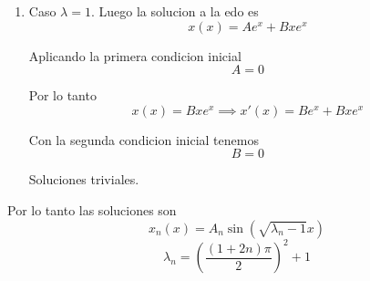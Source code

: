 \message{ !name(MAT024.tex)}\documentclass[../main.tex]{subfiles}
\begin{document}
\begin{solution}
\begin{enumerate}
      \item Caso $\lambda = 1$. Luego la solucion a la edo es
            \begin{equation*}
              x(x) = Ae^{x} + Bxe^{x}
            \end{equation*}

            Aplicando la primera condicion inicial
            \begin{equation*}
              A = 0
            \end{equation*}

            Por lo tanto
            \begin{equation*}
              x(x) = Bxe^{x} \implies x'(x) = Be^{x} + Bxe^{x}
            \end{equation*}

            Con la segunda condicion inicial tenemos
            \begin{equation*}
              B = 0
            \end{equation*}

            Soluciones triviales.
    \end{enumerate}

    Por lo tanto las soluciones son
    \begin{equation*}
      x_{n}(x) = A_{n}\sin(\sqrt{\lambda_{n} - 1}x)
    \end{equation*}
    \begin{equation*}
      \lambda_{n} = (\frac{(1 + 2n)\pi}{2})^{2} + 1
    \end{equation*}

\end{solution}
\end{document}
